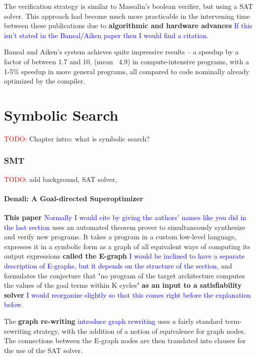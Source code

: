 \documentclass[12pt,twoside]{reedthesis}
\newcommand{\red}[1]{\textcolor{red}{#1}}
\newcommand{\comment}[2]{\textbf{#1} \textcolor{blue}{#2}}
\begin{document}
The verification strategy is similar to Massalin's boolean verifier, but using a SAT solver.
This approach had become much more practicable in the intervening time between these publications due to \comment{algorithmic and hardware advances}{If this isn't stated in the Bansal/Aiken paper then I would find a citation}.

Bansal and Aiken's system achieves quite impressive results 
    -- a speedup by a factor of between 1.7 and 10, (mean ~4.9) in compute-intensive programs, with a 1-5\% speedup in more general programs, all compared to code nominally already optimized by the compiler.

\chapter{Symbolic Search}

\red{TODO:} Chapter intro: what is symbolic search?

\subsection{SMT}

\red{TODO}: add background, SAT solver, 

\subsubsection{Denali: A Goal-directed Superoptimizer}
\comment{This paper}{Normally I would cite by giving the authors' names like you did in the last section} \cite{joshi2002denali} uses an automated theorem prover to simultaneously synthesize and verify new programs.
It takes a program in a custom low-level language, expresses it in a symbolic form as a graph of all equivalent ways of computing its output expressions \comment{called the E-graph}{I would be inclined to have a separate description of E-graphs, but it depends on the structure of the section}, and formulates the conjecture that "no program of the target architecture computes the values of the goal terms within K cycles" \comment{as an input to a satisfiability solver}{I would reorganize slightly so that this comes right before the explanation below}. 

The \comment{graph re-writing}{introduce graph rewriting} uses a fairly standard term-rewriting strategy, with the addition of a notion of equivalence for graph nodes.
The connections between the E-graph nodes are then translated into clauses for the use of the SAT solver.
\end{document}
